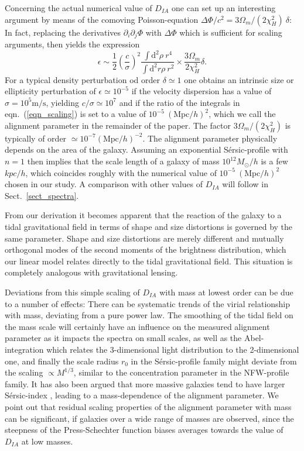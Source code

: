 \documentclass[a4paper,fleqn,usenatbib]{mnras}
\newcommand{\MyGreen}{\color[rgb]{0,0.6,0}}
\def\rut#1{{\MyGreen  #1}}
\begin{document}
\rut{Concerning the actual numerical value of $D_{IA}$ one can set up an interesting argument by means of the comoving Poisson-equation $\Delta\Phi/c^2 = 3\Omega_m/(2\chi_H^2)\:\delta$: In fact, replacing the derivatives $\partial_i\partial_j\Phi$ with $\Delta\Phi$ which is sufficient for scaling arguments, then yields the expression
\begin{equation}
\epsilon \sim \frac{1}{2}\left(\frac{c}{\sigma}\right)^2\frac{\int\mathrm{d}^2\rho\:r^4}{\int\mathrm{d}^2r\rho\:r^2}\times\frac{3\Omega_m}{2\chi_H^2}\delta.
\end{equation}
For a typical density perturbation od order $\delta \simeq 1$ one obtains an intrinsic size or ellipticity perturbation of $\epsilon\simeq10^{-5}$ if the velocity dispersion has a value of $\sigma=10^5\mathrm{m}/\mathrm{s}$, yielding $c/\sigma\simeq 10^7$ and if the ratio of the integrals in eqn.~(\ref{eqn_scaling}) is set to a value of $10^{-5}~(\mathrm{Mpc}/h)^2$, which we call the alignment parameter in the remainder of the paper. The factor $3\Omega_m/(2\chi_H^2)$ is typically  of order $\simeq10^{-7}(\mathrm{Mpc}/h)^{-2}$. The alignment parameter physically depends on the area of the galaxy. Assuming an exponential S{\'e}rsic-profile with $n=1$  then implies that the scale length of a galaxy of mass $10^{12}M_\odot/h$ is a few $kpc/h$, which coincides roughly with the numerical value of $10^{-5}~(\mathrm{Mpc}/h)^2$ chosen in our study.  A comparison with other values of $D_{IA}$ will follow in Sect.~\ref{sect_spectra}.}

\rut{From our derivation it becomes apparent that the reaction of the galaxy to a tidal gravitational field in terms of  shape and size distortions is governed by the same parameter. Shape and size distortions are merely different and mutually orthogonal modes of the second moments of the brightness distribution, which our linear model relates directly to the tidal gravitational field. This situation is completely analogous with gravitational lensing.}

\rut{Deviations from this simple scaling of $D_{IA}$ with mass at lowest order can be due to a number of effects: There can be systematic trends of the virial relationship with mass, deviating from a pure power law. The smoothing of the tidal field on the mass scale will certainly have an influence on the measured alignment parameter as it impacts the spectra on small scales, as well as the Abel-integration which relates the 3-dimensional light distribution to the 2-dimensional one, and finally the scale radius $r_0$ in the S{\'e}rsic-profile family might deviate from the scaling $\propto M^{1/3}$, similar to the concentration parameter in the NFW-profile family. It has also been argued that more massive galaxies tend to have larger  S{\'e}rsic-index \citep{10.1093/mnras/stu2467}, leading to a mass-dependence of the alignment parameter. We  point out that residual scaling properties of the alignment parameter with mass can be significant, if galaxies over a wide range of masses are observed, since the steepness of the Press-Schechter function biases  averages towards the value of $D_{IA}$ at low masses.}
\end{document}
